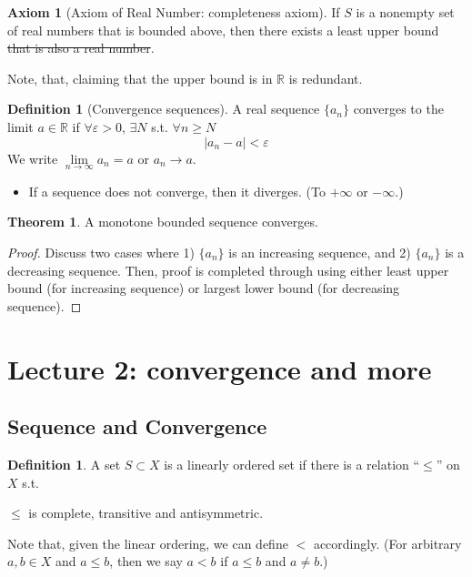 \documentclass[12pt]{article}
\newcommand{\R}{{\mathbb R}}
\theoremstyle{definition}
\newtheorem{THM}{Theorem}
\newtheorem{axiom}[theorem]{Axiom}
\newtheorem{definition}[theorem]{Definition}
\theoremstyle{plain}
\begin{document}
\begin{axiom}
    [Axiom of Real Number: completeness axiom]
    If $S$ is a nonempty set of real numbers that is bounded above, then there 
    exists a least upper bound \sout{that is also a real number}.

    Note, that, claiming that the upper bound is in $\R$ is redundant.

\end{axiom}

\begin{definition}
    [Convergence sequences]
    A real sequence $\{a_n\}$ converges to the limit $a\in \R$ if $\forall 
    \varepsilon > 0$, $\exists N$ s.t. $\forall n \ge N$
    \[
        |a_n - a| < \varepsilon
    \]
    We write $\underset{n\to\infty} \lim a_n = a$ or $a_n \to a$.
\end{definition}

\begin{itemize}
    \item If a sequence does not converge, then it diverges. (To $+\infty$ or 
        $-\infty$.)
\end{itemize}

\begin{THM}
    A monotone bounded sequence converges.
    \begin{proof}
        Discuss two cases where 1) $\{a_n\}$ is an increasing sequence, and 2) $\{a_n\}$ 
        is a decreasing sequence. Then, proof is completed through using either 
        least upper bound (for increasing sequence) or largest lower bound (for 
        decreasing sequence).
    \end{proof}
\end{THM}


\section{Lecture 2: convergence and more}
\setcounter{theorem}{0}

\subsection{Sequence and Convergence}
\begin{definition}
    A set $S \subset X$ is a linearly ordered set if there is a relation 
    ``$\le$'' on $X$ s.t.

    \begin{center}
        $\le$ is complete, transitive and antisymmetric.
    \end{center}

    Note that, given the linear ordering, we can define $<$ accordingly. 
    (For arbitrary $a,b \in X$ and $a \le b$, then we say $a<b$ if $a \le b$ and 
    $a \not = b$.)
\end{definition}
\end{document}
